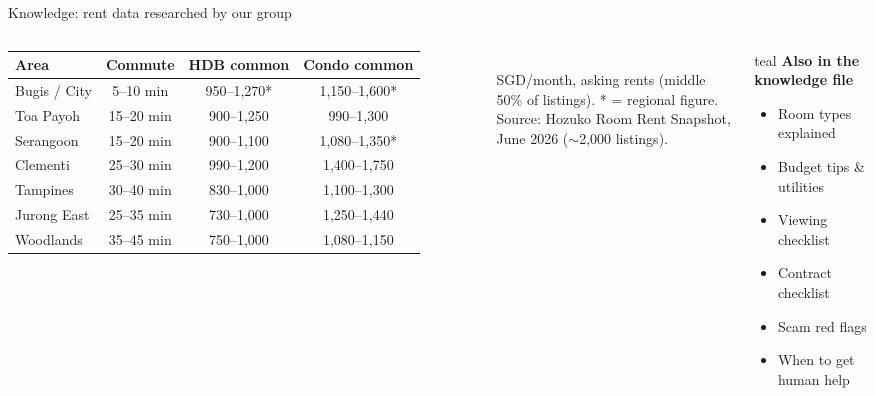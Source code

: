 \documentclass[aspectratio=169,11pt]{beamer}
\begin{document}
\begin{frame}{Knowledge: rent data researched by our group}
\footnotesize
\begin{columns}[T]
\setlength{\tabcolsep}{4pt}
\begin{tabular}{lccc}
\toprule
\textbf{Area} & \textbf{Commute} & \textbf{HDB common} & \textbf{Condo common} \\
\midrule
Bugis / City     & 5--10 min  & 950--1,270*  & 1,150--1,600* \\
Toa Payoh        & 15--20 min & 900--1,250   & 990--1,300 \\
Serangoon        & 15--20 min & 900--1,100   & 1,080--1,350* \\
Clementi         & 25--30 min & 990--1,200   & 1,400--1,750 \\
Tampines         & 30--40 min & 830--1,000   & 1,100--1,300 \\
Jurong East      & 25--35 min & 730--1,000   & 1,250--1,440 \\
Woodlands        & 35--45 min & 750--1,000   & 1,080--1,150 \\
\bottomrule
\end{tabular}\\[3pt]
\scriptsize SGD/month, asking rents (middle 50\% of listings). * = regional figure.\\
Source: Hozuko Room Rent Snapshot, June 2026 ($\sim$2,000 listings).

\begin{card}{teal}
\small\textbf{Also in the knowledge file}
\begin{itemize}\footnotesize
  \item Room types explained
  \item Budget tips \& utilities
  \item Viewing checklist
  \item Contract checklist
  \item Scam red flags
  \item When to get human help
\end{itemize}
\end{card}
\end{columns}
\end{frame}
\end{document}

